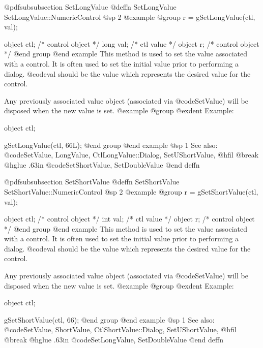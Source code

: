 @pdfsubsubsection {SetLongValue}
@deffn {SetLongValue} SetLongValue::NumericControl
@sp 2
@example
@group
r = gSetLongValue(ctl, val);

object  ctl;    /*  control object  */
long    val;    /*  ctl value       */
object  r;      /*  control object  */
@end group
@end example
This method is used to set the value associated with a control.  It is
often used to set the initial value prior to performing a dialog.
@code{val} should be the value which represents the desired value for
the control.

Any previously associated value object (associated via @code{SetValue})
will be disposed when the new value is set.
@example
@group
@exdent Example:

object  ctl;

gSetLongValue(ctl, 66L);
@end group
@end example
@sp 1
See also:  @code{SetValue, LongValue, CtlLongValue::Dialog, SetUShortValue,}
@hfil @break @hglue .63in @code{SetShortValue, SetDoubleValue}
@end deffn














@pdfsubsubsection {SetShortValue}
@deffn {SetShortValue} SetShortValue::NumericControl
@sp 2
@example
@group
r = gSetShortValue(ctl, val);

object  ctl;    /*  control object  */
int     val;    /*  ctl value       */
object  r;      /*  control object  */
@end group
@end example
This method is used to set the value associated with a control.  It is
often used to set the initial value prior to performing a dialog.
@code{val} should be the value which represents the desired value for
the control.

Any previously associated value object (associated via @code{SetValue})
will be disposed when the new value is set.
@example
@group
@exdent Example:

object  ctl;

gSetShortValue(ctl, 66);
@end group
@end example
@sp 1
See also:  @code{SetValue, ShortValue, CtlShortValue::Dialog, SetUShortValue,}
@hfil @break @hglue .63in @code{SetLongValue, SetDoubleValue}
@end deffn











